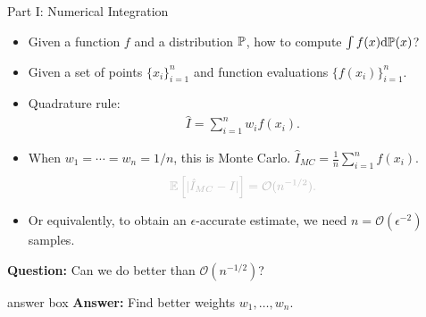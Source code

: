 \documentclass[aspectratio=169,xcolor=dvipsnames]{beamer}
\newenvironment{answerblock}{%
  \begin{beamercolorbox}[wd=\linewidth, sep=0.15em, rounded=true, shadow=true]{answer box}%
}{%
  \end{beamercolorbox}%
}
\begin{document}
\begin{frame}{Part I: Numerical Integration}
    \begin{itemize}
        \item Given a function $f$ and a distribution $\mathbb{P}$, how to compute $\int f(x) \mathrm{d} \mathbb{P}(x)$?
        \item Given a set of points $\{x_i\}_{i=1}^n$ and function evaluations $\{f(x_i)\}_{i=1}^n$.
        \item Quadrature rule:
        \begin{align*}
            \hat{I} = \sum_{i=1}^n w_i f(x_i).
        \end{align*}
    \end{itemize}
    \begingroup
    \color{black!25}
    \begin{itemize}
        \item \textcolor{black!25}{When $w_1=\cdots=w_n=1/n$, this is Monte Carlo. $\hat{I}_{MC} = \frac{1}{n}\sum_{i=1}^n f(x_i)$.}
        \begin{align*}
            \color{black!25}\E\left[|\hat{I}_{MC} - I|\right] = \mathcal{O}(n^{-1/2}).
        \end{align*}
        \item \textcolor{black!25}{Or equivalently, to obtain an $\epsilon$-accurate estimate, we need $n = \mathcal{O}(\epsilon^{-2})$ samples.}
    \end{itemize}
    \color{black!25}
    \begin{exampleblock}{}
        \centering
        \textbf{Question:} Can we do better than $\mathcal{O}(n^{-1/2})$?
    \end{exampleblock}
    \begin{answerblock}{}
    \centering \textbf{Answer:} Find better weights $w_1,\ldots,w_n$.
    \end{answerblock}
    \endgroup
\end{frame}
\end{document}
